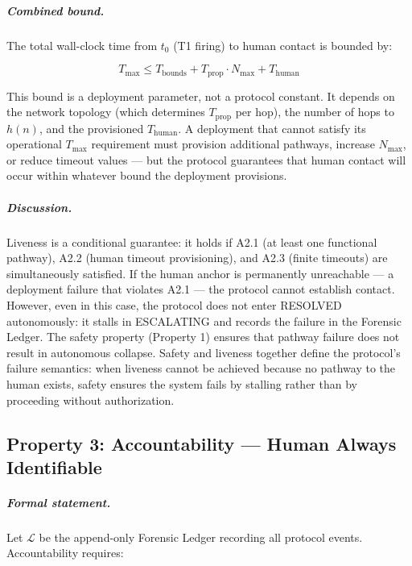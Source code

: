\subparagraph{Combined bound.} The total wall-clock time from $t_0$ (T1 firing) to human contact is bounded by:

\begin{equation}
T_{\max} \leq T_{\text{bounds}} + T_{\text{prop}} \cdot N_{\max} + T_{\text{human}}
\end{equation}

This bound is a deployment parameter, not a protocol constant. It depends on the network topology (which determines $T_{\text{prop}}$ per hop), the number of hops to $h(n)$, and the provisioned $T_{\text{human}}$. A deployment that cannot satisfy its operational $T_{\max}$ requirement must provision additional pathways, increase $N_{\max}$, or reduce timeout values --- but the protocol guarantees that human contact will occur within whatever bound the deployment provisions.

\subparagraph{Discussion.} Liveness is a conditional guarantee: it holds if A2.1 (at least one functional pathway), A2.2 (human timeout provisioning), and A2.3 (finite timeouts) are simultaneously satisfied. If the human anchor is permanently unreachable --- a deployment failure that violates A2.1 --- the protocol cannot establish contact. However, even in this case, the protocol does not enter RESOLVED autonomously: it stalls in ESCALATING and records the failure in the Forensic Ledger. The safety property (Property 1) ensures that pathway failure does not result in autonomous collapse. Safety and liveness together define the protocol's failure semantics: when liveness cannot be achieved because no pathway to the human exists, safety ensures the system fails by stalling rather than by proceeding without authorization.

\subsection{Property 3: Accountability --- Human Always Identifiable}


\subparagraph{Formal statement.} Let $\mathcal{L}$ be the append-only Forensic Ledger recording all protocol events. Accountability requires:

